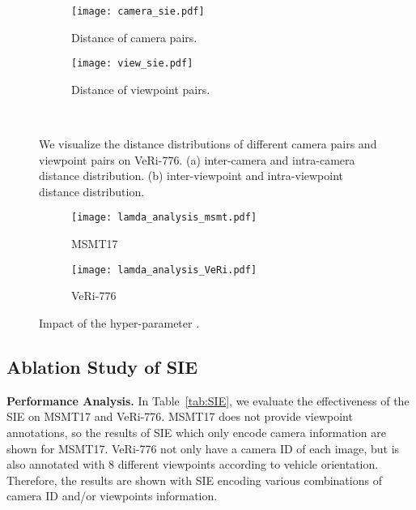 \documentclass[10pt,twocolumn,letterpaper]{article}
\begin{document}
\begin{figure}[tp]
     \centering
     \begin{subfigure}[b]{0.49\linewidth}\centering
         \texttt{[image: camera\_sie.pdf]}
         \caption{Distance of camera pairs.}
         \label{fig:a}
     \end{subfigure}
     \begin{subfigure}[b]{0.49\linewidth}\centering
         \texttt{[image: view\_sie.pdf]}
         \caption{Distance of viewpoint pairs.}
         \label{fig:c}
     \end{subfigure}
     \\

    \caption{We visualize the distance distributions of different camera pairs and viewpoint pairs on VeRi-776. (a) inter-camera and intra-camera distance distribution. (b) inter-viewpoint and intra-viewpoint distance distribution.}
    \label{fig:bias}
\end{figure}

\begin{figure}[tp]
    \centering
    \begin{subfigure}[b]{0.49\linewidth}\centering
         \texttt{[image: lamda\_analysis\_msmt.pdf]}
         \caption{MSMT17}
         \label{fig:lambda1}
    \end{subfigure}
    \begin{subfigure}[b]{0.49\linewidth}\centering
         \texttt{[image: lamda\_analysis\_VeRi.pdf]}
         \caption{VeRi-776}
         \label{fig:lambda2}
    \end{subfigure}
    \caption{Impact of the hyper-parameter .}
    \vspace{-1em}
    \label{fig:lambda}
\end{figure}



\subsection{Ablation Study of SIE}

\textbf{Performance Analysis.} In Table~\ref{tab:SIE}, we evaluate the effectiveness of the SIE on MSMT17 and VeRi-776. MSMT17 does not provide viewpoint annotations, so the results of SIE which only encode camera information are shown for MSMT17. VeRi-776 not only have a camera ID of each image, but is also annotated with 8 different viewpoints according to vehicle orientation. Therefore, the results are shown with SIE encoding various combinations of camera ID and/or viewpoints information.
\end{document}
